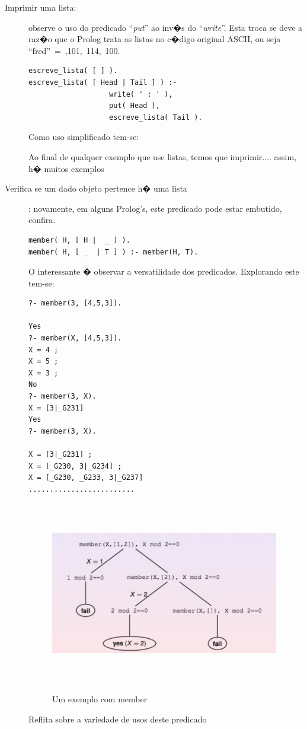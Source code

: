\documentclass[final,a4paper]{article}
\begin{document}
\begin{description}
\newpage
\item [Imprimir uma lista:] observe o uso do predicado
 ``{\em put}'' ao inv�s do ``{\em write}''.
Esta troca se deve a raz�o que o Prolog trata as listas no c�digo
original ASCII, ou seja \mbox{``fred'' = ,101, 114,
100\rbrack }.

\begin{verbatim}
escreve_lista( [ ] ).
escreve_lista( [ Head | Tail ] ) :-
                   write( ' : ' ),
                   put( Head ),
                   escreve_lista( Tail ).
\end{verbatim}

Como uso simplificado tem-se: 

\vfill

\begin{center}
\textsf{Ao final de qualquer exemplo que use listas, temos que 
imprimir.... assim, h� muitos exemplos}
\end{center}


\newpage
\item [Verifica se um dado objeto pertence h� uma  lista]: novamente, em alguns Prolog's, este predicado pode estar embutido, confira.
\begin{verbatim}
member( H, [ H |  _ ] ).
member( H, [ _  | T ] ) :- member(H, T).
\end{verbatim}

O interessante � observar a versatilidade dos predicados. Explorando este tem-se:
\begin{verbatim}
?- member(3, [4,5,3]).

Yes
?- member(X, [4,5,3]).
X = 4 ;
X = 5 ;
X = 3 ;
No
?- member(3, X).
X = [3|_G231] 
Yes
?- member(3, X).

X = [3|_G231] ;
X = [_G230, 3|_G234] ;
X = [_G230, _G233, 3|_G237] 
.........................
\end{verbatim}


\begin{figure}[!htb]
\centering
\includegraphics[height=8cm, width=10cm]{figuras/arv_member_mod.pdf}
\label{fig_arv_member_mod}
\caption{Um exemplo com member}
\end{figure}
\begin{center}
\textsf{Reflita sobre a variedade de usos deste predicado}
\end{center}



\end{description}
\end{document}

